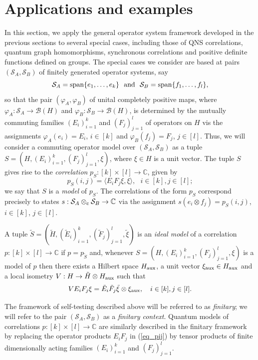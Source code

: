 \documentclass[11pt]{amsart}
\theoremstyle{definition}
\newcommand\nph{\varphi}
\newcommand{\cl}[1]{\mathcal{#1}}
\newcommand{\bb}[1]{\mathbb{#1}}
\begin{document}

\section{Applications and examples}\label{s_app}

In this section, we apply the general operator system framework developed in the previous sections to several special cases, including those of QNS 
correlations, quantum graph homomorphisms, synchronous correlations
and positive definite functions defined on groups. 
The special cases we consider are based at pairs $(\cl S_A,\cl S_B)$ 
of finitely generated operator systems, say 
$$\cl S_A = {\rm span}\{e_1,\dots,e_k\} \ \mbox{ and } \ 
\cl S_B = {\rm span}\{f_1,\dots,f_l\},$$
so that the pair $(\nph_A,\nph_B)$ of unital completely positive maps, 
where $\nph_A : \cl S_A\to \cl B(H)$ and $\nph_B : \cl S_B\to \cl B(H)$, 
is determined by the mutually commuting 
families $(E_i)_{i=1}^k$ and $(F_j)_{j=1}^l$ of 
operators on $H$ vis the assignments $\nph_A(e_i) = E_i$, $i\in [k]$ and 
$\nph_B(f_j) = F_j$, $j\in [l]$. Thus, 
we will consider a commuting operator model over $(\cl S_A,\cl S_B)$ 
as a tuple
$S = (H,(E_i)_{i=1}^k,(F_j)_{j=1}^l,\xi)$, where $\xi\in H$ is a unit vector. 
The tuple $S$ gives rise to the 
\emph{correlation} $p_S : [k]\times [l]\to \bb{C}$, given by 
\begin{equation}\label{eq_pij}
p_S(i,j) = \langle E_i F_j\xi,\xi\rangle, \ \ \ i\in [k],j\in [l];
\end{equation}
we say that $S$ is a \emph{model} of $p_S$. 
The correlations of the form $p_S$ correspond precisely to 
states $s : \cl S_A\otimes_{\rm c}\cl S_B\to \bb{C}$ via 
the assignment $s(e_i\otimes f_j) = p_S(i,j)$, $i\in [k]$, $j\in [l]$. 

A tuple $\tilde{S} = (\tilde{H},(\tilde{E}_i)_{i=1}^k,(\tilde{F}_j)_{j=1}^l,\tilde{\xi})$ 
is an \emph{ideal model} of a correlation $p : [k]\times [l]\to \bb{C}$ if 
$p = p_{\tilde{S}}$ and, whenever 
$S = (H,(E_i)_{i=1}^k,(F_j)_{j=1}^l,\xi)$ is a model of $p$ then there exists 
a Hilbert space $H_{\rm aux}$, a unit vector $\xi_{\rm aux}\in H_{\rm aux}$ 
and a local isometry $V : H\to \tilde{H}\otimes H_{\rm aux}$ such that 
$$V E_i F_j \xi = \tilde{E}_i \tilde{F}_j \tilde{\xi} \otimes \xi_{\rm aux}, 
\ \ \ i\in [k], j\in [l].$$

The framework of self-testing described above will be referred to as 
\emph{finitary}; we will refer to the pair $(\cl S_A,\cl S_B)$ as a 
\emph{finitary context}.
Quantum models of correlations $p : [k]\times [l]\to \bb{C}$
are similarly described in the finitary framework by replacing 
the operator products $E_iF_j$ in (\ref{eq_pij}) by tensor 
products of finite dimensionally acting families $(E_i)_{i=1}^k$ and 
$(F_j)_{j=1}^l$. 
\end{document}
